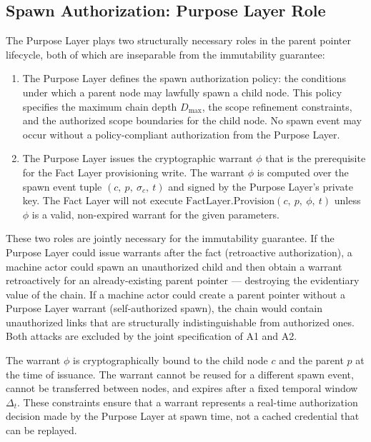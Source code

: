 \subsection{Spawn Authorization: Purpose Layer Role}
\label{sec:purpose-layer-authorization}

The Purpose Layer plays two structurally necessary roles in the parent pointer lifecycle, both of which are inseparable from the immutability guarantee:

\begin{enumerate}
    \item[(A1) \textbf{Policy origination.}] The Purpose Layer defines the spawn authorization policy: the conditions under which a parent node may lawfully spawn a child node. This policy specifies the maximum chain depth $D_{\max}$, the scope refinement constraints, and the authorized scope boundaries for the child node. No spawn event may occur without a policy-compliant authorization from the Purpose Layer.

    \item[(A2) \textbf{Warrant issuance.}] The Purpose Layer issues the cryptographic warrant $\phi$ that is the prerequisite for the Fact Layer provisioning write. The warrant $\phi$ is computed over the spawn event tuple $(c,\ p,\ \sigma_c,\ t)$ and signed by the Purpose Layer's private key. The Fact Layer will not execute $\text{FactLayer.Provision}(c,\ p,\ \phi,\ t)$ unless $\phi$ is a valid, non-expired warrant for the given parameters.
\end{enumerate}

These two roles are jointly necessary for the immutability guarantee. If the Purpose Layer could issue warrants after the fact (retroactive authorization), a machine actor could spawn an unauthorized child and then obtain a warrant retroactively for an already-existing parent pointer — destroying the evidentiary value of the chain. If a machine actor could create a parent pointer without a Purpose Layer warrant (self-authorized spawn), the chain would contain unauthorized links that are structurally indistinguishable from authorized ones. Both attacks are excluded by the joint specification of A1 and A2.

The warrant $\phi$ is cryptographically bound to the child node $c$ and the parent $p$ at the time of issuance. The warrant cannot be reused for a different spawn event, cannot be transferred between nodes, and expires after a fixed temporal window $\Delta_t$. These constraints ensure that a warrant represents a real-time authorization decision made by the Purpose Layer at spawn time, not a cached credential that can be replayed.

